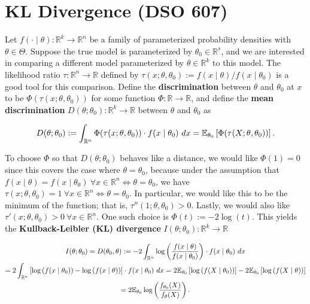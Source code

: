 %
%
%
%



\section{KL Divergence (DSO 607)}\label{prob.kl.divergence}

Let \(f(\cdot \mid \theta): \mathbb{R}^k \to \mathbb{R}^n\) be a family of parameterized probability densities with \(\theta \in \Theta\). Suppose the true model is parameterized by \(\theta_0 \in \mathbb{R}^s\), and we are interested in comparing a different model parameterized by \(\theta \in \mathbb{R}^k\) to this model. The likelihood ratio \(\tau: \mathbb{R}^n \to \mathbb{R}\) defined by \(\tau(x; \theta, \theta_0) := f(x \mid \theta)/f(x \mid \theta_0)\) is a good tool for this comparison. Define the \textbf{discrimination} between \(\theta\) and \(\theta_0\) at \(x\) to be \(\Phi(\tau(x; \theta, \theta_0))\) for some function \(\Phi: \mathbb{R} \to \mathbb{R}\), and define the \textbf{mean discrimination} \(D(\theta; \theta_0): \mathbb{R}^k \to \mathbb{R}\) between \(\theta\) and \(\theta_0\) as

\[
D(\theta; \theta_0) := \int_{\mathbb{R}^n} \Phi(\tau(x; \theta, \theta_0)) \cdot f(x \mid \theta_0) \ dx = \mathbb{E}_{\theta_0} \left[ \Phi(\tau(X; \theta, \theta_0)) \right].
\]

To choose \(\Phi\) so that \(D(\theta; \theta_0)\) behaves like a distance, we would like \(\Phi(1) = 0\) since this covers the case where \(\theta = \theta_0\), because under the assumption that \(f(x \mid \theta) = f(x \mid \theta_0) \ \forall x \in \mathbb{R}^n \iff \theta = \theta_0\), we have \(\tau(x; \theta, \theta_0) = 1 \ \forall x \in \mathbb{R}^n  \iff \theta = \theta_0\). In particular, we would like this to be the minimum of the function; that is, \(\tau''(1; \theta, \theta_0) > 0\). Lastly, we would also like \(\tau'(x; \theta, \theta_0) > 0 \ \forall x \in \mathbb{R}^n\). One such choice is \(\Phi(t) := - 2 \log (t)\). This yields the \textbf{Kullback-Leibler (KL) divergence} \(I(\theta; \theta_0) : \mathbb{R}^k \to \mathbb{R}\)

\begin{multline*}
I(\theta; \theta_0) = D(\theta_0, \theta) := -2\int_{\mathbb{R}^n} \log \left( \frac{f(x \mid \theta)}{f(x \mid \theta_0)} \right) \cdot f(x \mid \theta_0) \ dx 
\\ = 2\int_{\mathbb{R}^n} \left[ \log \left( f(x \mid \theta_0) \right) - \log \left( f(x \mid \theta) \right) \right]\cdot f(x \mid \theta_0) \ dx  = 2\E_{\theta_0} \left[ \log \left( f(X \mid \theta_0) \right) \right] - 2 \E_{\theta_0} \left[ \log \left( f(X \mid \theta) \right) \right]
\\  = 2 \E_{\theta_0} \log \left(  \frac{f_{\theta_0}(X) }{f_{\theta}(X)} \right) .
\end{multline*}

